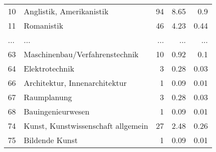 \begin{longtable}{lXrrr}
        10 & \multicolumn{1}{X}{Anglistik, Amerikanistik} & %
          \num{94} &
          \num[round-mode=places,round-precision=2]{8.65} &
          \num[round-mode=places,round-precision=2]{0.9} \\
        11 & \multicolumn{1}{X}{Romanistik} & %
          \num{46} &
          \num[round-mode=places,round-precision=2]{4.23} &
          \num[round-mode=places,round-precision=2]{0.44} \\
       ... & ... & ... & ... & ... \\
        63 & \multicolumn{1}{X}{Maschinenbau/Verfahrenstechnik} & %
          \num{10} &
          \num[round-mode=places,round-precision=2]{0.92} &
          \num[round-mode=places,round-precision=2]{0.1} \\

        64 & \multicolumn{1}{X}{Elektrotechnik} & %
          \num{3} &
          \num[round-mode=places,round-precision=2]{0.28} &
          \num[round-mode=places,round-precision=2]{0.03} \\

        66 & \multicolumn{1}{X}{Architektur, Innenarchitektur} & %
          \num{1} &
          \num[round-mode=places,round-precision=2]{0.09} &
          \num[round-mode=places,round-precision=2]{0.01} \\

        67 & \multicolumn{1}{X}{Raumplanung} & %
          \num{3} &
          \num[round-mode=places,round-precision=2]{0.28} &
          \num[round-mode=places,round-precision=2]{0.03} \\

        68 & \multicolumn{1}{X}{Bauingenieurwesen} & %
          \num{1} &
          \num[round-mode=places,round-precision=2]{0.09} &
          \num[round-mode=places,round-precision=2]{0.01} \\

        74 & \multicolumn{1}{X}{Kunst, Kunstwissenschaft allgemein} & %
          \num{27} &
          \num[round-mode=places,round-precision=2]{2.48} &
          \num[round-mode=places,round-precision=2]{0.26} \\

        75 & \multicolumn{1}{X}{Bildende Kunst} & %
          \num{1} &
          \num[round-mode=places,round-precision=2]{0.09} &
          \num[round-mode=places,round-precision=2]{0.01} \\


\end{longtable}
